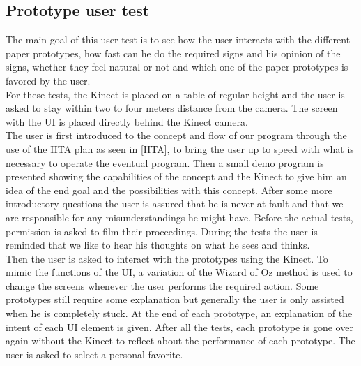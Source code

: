 \subsection{Prototype user test}

The main goal of this user test is to see how the user interacts with the different paper prototypes, how fast can he do the required signs and his opinion of the signs, whether they feel natural or not and which one of the paper prototypes is favored by the user.\\

For these tests, the Kinect is placed on a table of regular height and the user is asked to stay within two to four meters distance from the camera. The screen with the UI is placed directly behind the Kinect camera.\\

The user is first introduced to the concept and flow of our program through the use of the HTA plan as seen in \ref{HTA}, to bring the user up to speed with what is necessary to operate the eventual program. Then a small demo program is presented showing the capabilities of the concept and the Kinect to give him an idea of the end goal and the possibilities with this concept. After some more introductory questions the user is assured that he is never at fault and that we are responsible for any misunderstandings he might have. Before the actual tests, permission is asked to film their proceedings. During the tests the user is reminded that we like to hear his thoughts on what he sees and thinks.\\

Then the user is asked to interact with the prototypes using the Kinect. To mimic the functions of the UI, a variation of the Wizard of Oz method \cite{WizardOfOz} is used to change the screens whenever the user performs the required action. Some prototypes still require some explanation but generally the user is only assisted when he is completely stuck. At the end of each prototype, an explanation of the intent of each UI element is given. After all the tests, each prototype is gone over again without the Kinect to reflect about the performance of each prototype. The user is asked to select a personal favorite.\\

